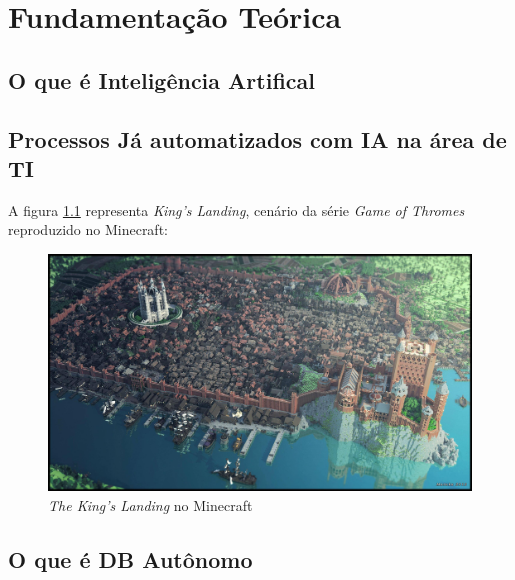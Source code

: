 \chapter{Fundamentação Teórica}

\lipsum[1-2]

\begin{citacao}
\lipsum[1]\cite[p. ~34]{Huizinga2014}
\end{citacao}

\section{O que é Inteligência Artifical}


\lipsum[4-7]

\section{Processos Já automatizados com IA na área de TI}

\lipsum[8-9]

A figura \ref{fig:kings-landing} representa \emph{King's Landing}, cenário da série \emph{Game of Thromes} reproduzido no Minecraft:

\begin{figure}[h]
	\caption{\emph{The King's Landing} no Minecraft}
	\center
	\label{fig:kings-landing}
	\includegraphics[scale=0.15]{fundamentacao/kings-landing.jpg}
\end{figure}

\lipsum[10-12]


\section{O que é DB Autônomo}

\lipsum[1-2]


